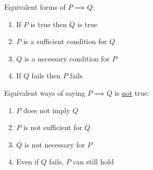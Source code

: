 \begin{frame}
    
    Equivalent forms of $P \implies Q$:
    \begin{enumerate}
        \item If $P$ is true then $Q$ is true
        \item $P$ is a sufficient condition for $Q$
        \item $Q$ is a necessary condition for $P$
        \item If $Q$ fails then $P$ fails
    \end{enumerate}

    \begin{figure}[h]
       \begin{center}
        \scalebox{.4}{}
       \end{center}
    \end{figure}

\end{frame}

\begin{frame}
    
    Equivalent ways of saying $P \implies Q$ is \underline{not} true:
    \begin{enumerate}
        \item $P$ does not imply $Q$
        \item $P$ is not sufficient for $Q$
        \item $Q$ is not necessary for $P$
        \item Even if $Q$ fails, $P$ can still hold
    \end{enumerate}

    \begin{figure}[h]
       \begin{center}
        \scalebox{.4}{}
       \end{center}
    \end{figure}

\end{frame}



